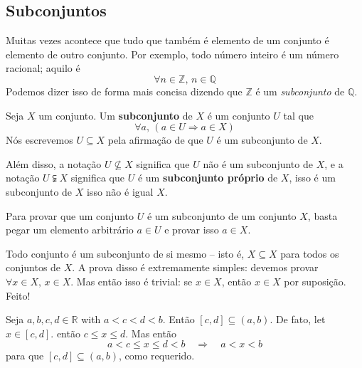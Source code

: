 \subsection*{Subconjuntos}

Muitas vezes acontece que tudo que também é elemento de um conjunto é elemento de outro conjunto. Por exemplo, todo número inteiro é um número racional; aquilo é
\[ \forall n \in \mathbb{Z},\, n \in \mathbb{Q} \]
Podemos dizer isso de forma mais concisa dizendo que $\mathbb{Z}$ é um \textit{subconjunto} de $\mathbb{Q}$.

\begin{definition}
\label{defSubset}
Seja $X$ um conjunto. Um \textbf{subconjunto} de $X$ é um conjunto $U$ tal que
\[ \forall a,\, (a \in U \Rightarrow a \in X) \]
Nós escrevemos $U \subseteq X$  pela afirmação de que $U$ é um subconjunto de $X$.

Além disso, a notação $U \nsubseteq X$  significa que $U$ não é um subconjunto de $X$, e a notação $U \subsetneqq X$  significa que $U$ é um \textbf{subconjunto próprio} de $X$, isso é um subconjunto de $X$ isso não é igual $X$.
\end{definition}

\begin{strategy}
Para provar que um conjunto $U$ é um subconjunto de um conjunto $X$, basta pegar um elemento arbitrário $a \in U$ e provar isso $a \in X$.
\end{strategy}

\begin{example}
Todo conjunto é um subconjunto de si mesmo – isto é, $X \subseteq X$ para todos os conjuntos de $X$. A prova disso é extremamente simples: devemos provar $\forall x \in X,\, x \in X$. Mas então isso é trivial: se $x \in X$, então $x \in X$ por suposição. Feito!
\end{example}

\begin{example}
Seja $a,b,c,d \in \mathbb{R}$ with $a<c<d<b$. Então $[c,d] \subseteq (a,b)$. De fato, let $x \in [c,d]$. então $c \le x \le d$. Mas então
\[ a < c \le x \le d < b \quad \Rightarrow \quad a < x < b \]
para que $[c,d] \subseteq (a,b)$, como requerido.
\end{example}

